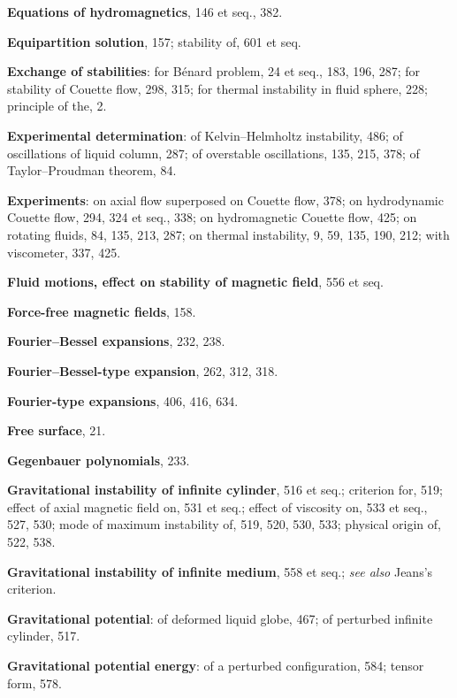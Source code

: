 \begin{small}
\medskip\noindent
\textbf{Equations of hydromagnetics}, 146 et seq.,
  382.

\medskip\noindent
\textbf{Equipartition solution}, 157;
  stability of, 601 et seq.

\medskip\noindent
\textbf{Exchange of stabilities}:
  for B\'enard problem, 24 et seq., 183, 196,
    287;
  for stability of Couette flow, 298, 315;
  for thermal instability in fluid sphere,
    228;
  principle of the, 2.

\medskip\noindent
\textbf{Experimental determination}:
  of Kelvin--Helmholtz instability, 486;
  of oscillations of liquid column, 287;
  of overstable oscillations, 135, 215, 378;
  of Taylor--Proudman theorem, 84.

\medskip\noindent
\textbf{Experiments}:
  on axial flow superposed on Couette
    flow, 378;
  on hydrodynamic Couette flow, 294, 324
    et seq., 338;
  on hydromagnetic Couette flow, 425;
  on rotating fluids, 84, 135, 213, 287;
  on thermal instability, 9, 59, 135, 190,
    212;
  with viscometer, 337, 425.

\bigskip\noindent
\textbf{Fluid motions, effect on stability of magnetic field}, 556 et seq.

\medskip\noindent
\textbf{Force-free magnetic fields}, 158.

\medskip\noindent
\textbf{Fourier--Bessel expansions}, 232, 238.

\medskip\noindent
\textbf{Fourier--Bessel-type expansion}, 262, 312,
  318.

\medskip\noindent
\textbf{Fourier-type expansions}, 406, 416, 634.

\medskip\noindent
\textbf{Free surface}, 21.

\bigskip\noindent
\textbf{Gegenbauer polynomials}, 233.

\medskip\noindent
\textbf{Gravitational instability of infinite cylinder}, 516 et seq.;
  criterion for, 519;
  effect of axial magnetic field on, 531 et
    seq.;
  effect of viscosity on, 533 et seq., 527,
    530;
  mode of maximum instability of, 519,
    520, 530, 533;
  physical origin of, 522, 538.

\medskip\noindent
\textbf{Gravitational instability of infinite medium}, 558 et seq.;
  \textit{see also} Jeans's criterion.

\medskip\noindent
\textbf{Gravitational potential}:
  of deformed liquid globe, 467;
  of perturbed infinite cylinder, 517.

\medskip\noindent
\textbf{Gravitational potential energy}:
  of a perturbed configuration, 584;
  tensor form, 578.


\end{small}
